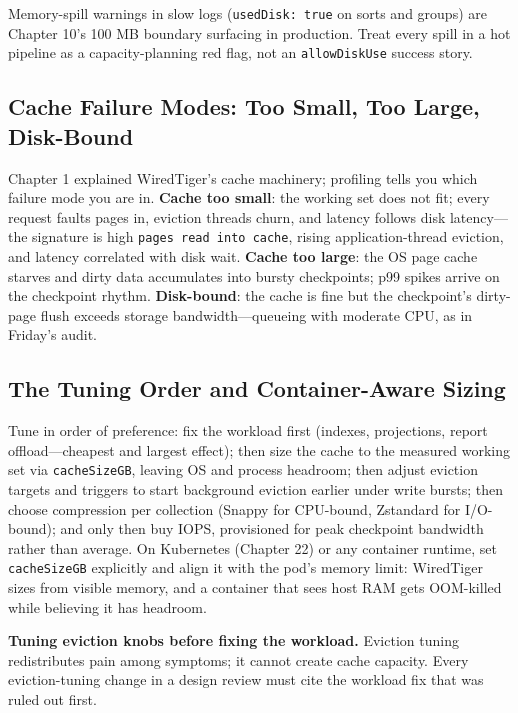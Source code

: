 \begin{notebox}
Memory-spill warnings in slow logs (\texttt{usedDisk: true} on sorts and groups) are Chapter 10's 100 MB boundary surfacing in production. Treat every spill in a hot pipeline as a capacity-planning red flag, not an \texttt{allowDiskUse} success story.
\end{notebox}

\subsection{Cache Failure Modes: Too Small, Too Large, Disk-Bound}
Chapter 1 explained WiredTiger's cache machinery; profiling tells you which failure mode you are in. \textbf{Cache too small}: the working set does not fit; every request faults pages in, eviction threads churn, and latency follows disk latency---the signature is high \texttt{pages read into cache}, rising application-thread eviction, and latency correlated with disk wait. \textbf{Cache too large}: the OS page cache starves and dirty data accumulates into bursty checkpoints; p99 spikes arrive on the checkpoint rhythm. \textbf{Disk-bound}: the cache is fine but the checkpoint's dirty-page flush exceeds storage bandwidth---queueing with moderate CPU, as in Friday's audit.

\subsection{The Tuning Order and Container-Aware Sizing}
Tune in order of preference: fix the workload first (indexes, projections, report offload---cheapest and largest effect); then size the cache to the measured working set via \texttt{cacheSizeGB}, leaving OS and process headroom; then adjust eviction targets and triggers to start background eviction earlier under write bursts; then choose compression per collection (Snappy for CPU-bound, Zstandard for I/O-bound); and only then buy IOPS, provisioned for peak checkpoint bandwidth rather than average. On Kubernetes (Chapter 22) or any container runtime, set \texttt{cacheSizeGB} explicitly and align it with the pod's memory limit: WiredTiger sizes from visible memory, and a container that sees host RAM gets OOM-killed while believing it has headroom.

\begin{pitfall}
\textbf{Tuning eviction knobs before fixing the workload.} Eviction tuning redistributes pain among symptoms; it cannot create cache capacity. Every eviction-tuning change in a design review must cite the workload fix that was ruled out first.
\end{pitfall}

